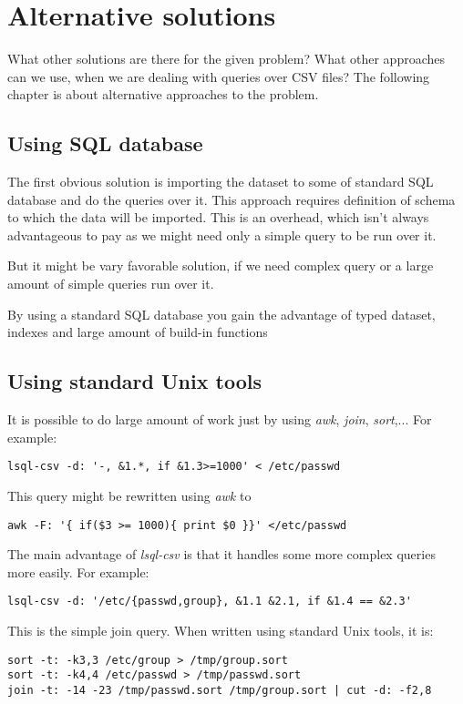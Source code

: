 
\chapter{Alternative solutions}
What other solutions are there for the given problem? What other approaches can we use, when we are dealing with queries over CSV files? 
The following chapter is about alternative approaches to the problem.

\section{Using SQL database}
The first obvious solution is importing the dataset to some of standard SQL database and do the queries over it. 
This approach requires definition of schema to which the data will be imported. This is an overhead, which isn't
always advantageous to pay as we might need only a simple query to be run over it.

But it might be vary favorable solution, if we need complex query or a large amount of simple queries run over it.

By using a standard SQL database you gain the advantage of typed dataset, indexes and large amount of build-in functions

\section{Using standard Unix tools}
It is possible to do large amount of work just by using \textit{awk}, \textit{join}, \textit{sort},...
For example:

\begin{verbatim}
lsql-csv -d: '-, &1.*, if &1.3>=1000' < /etc/passwd
\end{verbatim}

This query might be rewritten using \textit{awk} to
\begin{verbatim}
awk -F: '{ if($3 >= 1000){ print $0 }}' </etc/passwd
\end{verbatim}

The main advantage of \textit{lsql-csv} is that it handles some more complex queries more easily. For example:
\begin{verbatim}
lsql-csv -d: '/etc/{passwd,group}, &1.1 &2.1, if &1.4 == &2.3'
\end{verbatim}

This is the simple join query. When written using standard Unix tools, it is:
\begin{verbatim}
sort -t: -k3,3 /etc/group > /tmp/group.sort
sort -t: -k4,4 /etc/passwd > /tmp/passwd.sort
join -t: -14 -23 /tmp/passwd.sort /tmp/group.sort | cut -d: -f2,8 
\end{verbatim}

